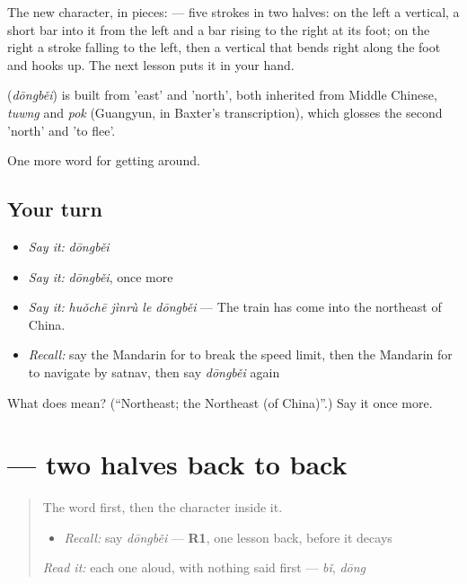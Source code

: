 The new character, in pieces:  — five strokes in two halves: on the left a vertical, a short bar into it from the left and a bar rising to the right at its foot; on the right a stroke falling to the left, then a vertical that bends right along the foot and hooks up. The next lesson puts it in your hand.

\begin{cousinweb}
\textbf{} (\emph{dōngběi}) is built from  'east' and  'north', both inherited from Middle Chinese, \emph{tuwng} and \emph{pok} (Guangyun, in Baxter's transcription), which glosses the second 'north' and 'to flee'.
\end{cousinweb}

\begin{grammarlens}[title={What you've built}]
One more word for getting around.
\end{grammarlens}

\subsection*{Your turn}
\begin{itemize}
\raggedright
  \item \emph{Say it:} \emph{dōngběi}
  \item \emph{Say it:} \emph{dōngběi}, once more
  \item \emph{Say it:} \emph{huǒchē jìnrù le dōngběi} — The train has come into the northeast of China.
  \item \emph{Recall:} say the Mandarin for to break the speed limit, then the Mandarin for to navigate by satnav, then say \emph{dōngběi} again
\end{itemize}

\begin{tcolorbox}[breakable,colback=teal!4,colframe=teal!35!black,title={Before you move on}]
What does  mean? (\textquotedblleft{}Northeast; the Northeast (of China)\textquotedblright{}.) Say it once more.
\end{tcolorbox}
\section[\texorpdfstring{\zh{北} (běi)}{北 (běi)}]{ — two halves back to back}

\label{lesson:ZH-W422-bei-north}



\begin{quote}
The word first, then the character inside it.

\begin{itemize}
\raggedright
  \item \emph{Recall:} say \emph{dōngběi} — \textbf{R1}, one lesson back, before it decays
\end{itemize}

\begin{quote}
 
\end{quote}

\emph{Read it:} each one aloud, with nothing said first — \emph{bǐ}, \emph{dōng}
\end{quote}

